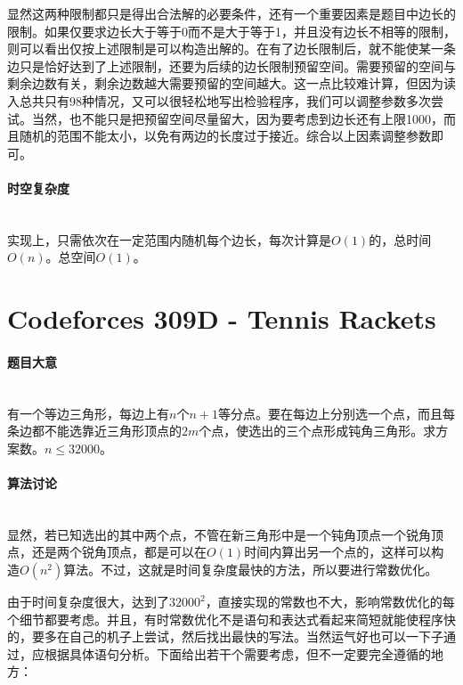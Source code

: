 \documentclass[UTF8]{ctexart}
\newcommand{\myparagraph}[1]{\paragraph{#1}\mbox{}\\}
\theoremstyle{nonumberplain}
\begin{document}
			显然这两种限制都只是得出合法解的必要条件，还有一个重要因素是题目中边长的限制。如果仅要求边长大于等于0而不是大于等于1，并且没有边长不相等的限制，则可以看出仅按上述限制是可以构造出解的。在有了边长限制后，就不能使某一条边只是恰好达到了上述限制，还要为后续的边长限制预留空间。需要预留的空间与剩余边数有关，剩余边数越大需要预留的空间越大。这一点比较难计算，但因为读入总共只有98种情况，又可以很轻松地写出检验程序，我们可以调整参数多次尝试。当然，也不能只是把预留空间尽量留大，因为要考虑到边长还有上限1000，而且随机的范围不能太小，以免有两边的长度过于接近。综合以上因素调整参数即可。
		
		\myparagraph{时空复杂度}
		
			实现上，只需依次在一定范围内随机每个边长，每次计算是$O(1)$的，总时间$O(n)$。总空间$O(1)$。
	
	\section{Codeforces 309D - Tennis Rackets}
	
		\myparagraph{题目大意}
		
			有一个等边三角形，每边上有$n$个$n+1$等分点。要在每边上分别选一个点，而且每条边都不能选靠近三角形顶点的$2m$个点，使选出的三个点形成钝角三角形。求方案数。$n \leq 32000$。
		
		\myparagraph{算法讨论}
		
			显然，若已知选出的其中两个点，不管在新三角形中是一个钝角顶点一个锐角顶点，还是两个锐角顶点，都是可以在$O(1)$时间内算出另一个点的，这样可以构造$O(n^2)$算法。不过，这就是时间复杂度最快的方法，所以要进行常数优化。
			
			由于时间复杂度很大，达到了$32000^2$，直接实现的常数也不大，影响常数优化的每个细节都要考虑。并且，有时常数优化不是语句和表达式看起来简短就能使程序快的，要多在自己的机子上尝试，然后找出最快的写法。当然运气好也可以一下子通过，应根据具体语句分析。下面给出若干个需要考虑，但不一定要完全遵循的地方：
			
\end{document}
